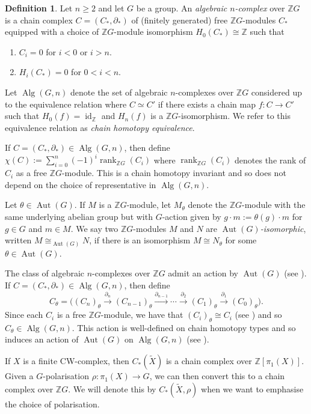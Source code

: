 \documentclass[11pt,a4paper,leqno]{amsart}
\theoremstyle{definition}
\newtheorem{definition}[theorem]{Definition}
\theoremstyle{remark}
\newenvironment{clist}[1]
{\begin{enumerate}[\normalfont #1]}
{\end{enumerate}}
\newcommand{\wt}{\widetilde}
\newcommand{\Z}{\mathbb{Z}}
\DeclareMathOperator{\Aut}{Aut}
\DeclareMathOperator{\id}{id}
\DeclareMathOperator{\rank}{rank}
\DeclareMathOperator{\Alg}{Alg}
\newcommand{\bd}{\partial}
\begin{document}
\begin{definition}
Let $n \ge 2$ and let $G$ be a group. An \textit{algebraic $n$-complex} over $\Z G$ is a chain complex $C = (C_*,\bd_*)$ of (finitely generated) free $\Z G$-modules $C_*$ equipped with a choice of $\Z G$-module isomorphism $H_0(C_*) \cong \Z$ such that
\begin{clist}{(i)}
\item
$C_i = 0$ for $i < 0$ or $i > n$.
\item
$H_i(C_*)=0$ for $0 < i < n$.
\end{clist}

Let $\Alg(G,n)$ denote the set of algebraic $n$-complexes over $\Z G$ considered up to the equivalence relation where $C \simeq C'$ if there exists a chain map $f\colon  C \to C'$ such that $H_0(f) = \id_{\Z}$ and $H_n(f)$ is a $\Z G$-isomorphism. We refer to this equivalence relation as \textit{chain homotopy equivalence}.
\end{definition}

If $C = (C_*,\bd_*) \in \Alg(G,n)$, then define $\chi(C) := \sum_{i=0}^n (-1)^i \rank_{\Z G}(C_i)$
where $\rank_{\Z G}(C_i)$ denotes the rank of $C_i$ as a free $\Z G$-module. 
This is a chain homotopy invariant and so does not depend on the choice of representative in $\Alg(G,n)$.

Let $\theta \in \Aut(G)$. If $M$ is a $\Z G$-module, let $M_\theta$ denote the $\Z G$-module with the same underlying abelian group but with $G$-action given by $g \cdot m := \theta(g) \cdot m$ for $g \in G$ and $m \in M$. 
We say two $\Z G$-modules $M$ and $N$ are \textit{$\Aut(G)$-isomorphic}, written $M \cong_{\Aut(G)} N$, if there is an isomorphism $M \cong N_\theta$ for some $\theta \in \Aut(G)$.

The class of algebraic $n$-complexes over $\Z G$ admit an action by $\Aut(G)$ (see \cite[Section 6]{Ni20-I}). If $C = (C_*,\partial_*) \in \Alg(G,n)$, then define
\[ C_\theta  = \big ((C_n)_\theta \xrightarrow[]{\bd_n} (C_{n-1})_\theta \xrightarrow[]{\bd_{n-1}} \cdots \xrightarrow[]{\bd_2} (C_1)_\theta \xrightarrow[]{\bd_1} (C_0)_\theta \big ). \]
Since each $C_i$ is a free $\Z G$-module, we have that $(C_i)_\theta \cong C_i$ (see \cite[Lemma 6.1 (i)]{Ni20-I}) and so $C_\theta \in \Alg(G,n)$. This action is well-defined on chain homotopy types and so induces an action of $\Aut(G)$ on $\Alg(G,n)$ (see \cite[Section 6]{Ni20-I}).

If $X$ is a finite CW-complex, then $C_*(\wt X)$ is a chain complex over $\Z[\pi_1(X)]$. Given a $G$-polarisation $\rho\colon  \pi_1(X) \to G$, we can then convert this to a chain complex over $\Z G$. We will denote this by $C_*(\wt X, \rho)$ when we want to emphasise the choice of polarisation. 
\end{document}
